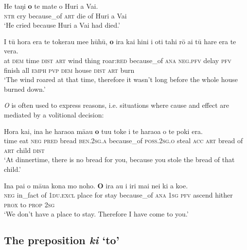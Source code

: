 \ea\label{ex:4.252}
\gll He taŋi \textbf{{\ꞌ}o} te mate o Huri {\ꞌ}a Vai. \\
\textsc{ntr} cry because\_of \textsc{art} die of Huri a Vai \\

\glt 
‘He cried because Huri a Vai had died.’ \textstyleExampleref{[R304.104]} 
\z

\ea\label{ex:4.253}
\gll {\ꞌ}I tū hora era te tokerau me{\ꞌ}e hūhū, \textbf{{\ꞌ}o} ira kai hini i oti tahi rō ai tū hare era te vera. \\
at \textsc{dem} time \textsc{dist} \textsc{art} wind thing roar:\textsc{red} because\_of \textsc{ana} \textsc{neg.pfv} delay \textsc{pfv} finish all \textsc{emph} \textsc{pvp} \textsc{dem} house \textsc{dist} \textsc{art} burn \\

\glt
‘The wind roared at that time, therefore it wasn’t long before the whole house burned down.’ \textstyleExampleref{[R250.120]} 
\z

\textit{{\ꞌ}O} is often used to express reasons, i.e. situations where cause and effect are mediated by a volitional decision:

\ea\label{ex:4.254}
\gll Hora kai, {\ꞌ}ina he haraoa mā{\ꞌ}au \textbf{{\ꞌ}o} tu{\ꞌ}u toke i te haraoa  o te poki era.\\
time eat \textsc{neg} \textsc{pred} bread \textsc{ben.2sg.a} because\_of \textsc{poss.2sg.o} steal \textsc{acc} \textsc{art} bread  of \textsc{art} child \textsc{dist}\\

\glt 
‘At dinnertime, there is no bread for you, because you stole the bread of that child.’ \textstyleExampleref{[R245.048]} 
\z

\ea\label{ex:4.255}
\gll {\ꞌ}Ina pa{\ꞌ}i o māua kona mo noho. \textbf{{\ꞌ}O} ira au i iri   mai nei ki a koe.\\
\textsc{neg} in\_fact of \textsc{1du.excl} place for stay because\_of \textsc{ana} \textsc{1sg} \textsc{pfv} ascend   hither \textsc{prox} to \textsc{prop} \textsc{2sg}\\

\glt 
‘We don’t have a place to stay. Therefore I have come to you.’ \textstyleExampleref{[R229.210]}\textstyleExampleref{} 
\z
{}

\subsection{The preposition \textit{ki} ‘to’}\label{sec:4.7.3}

